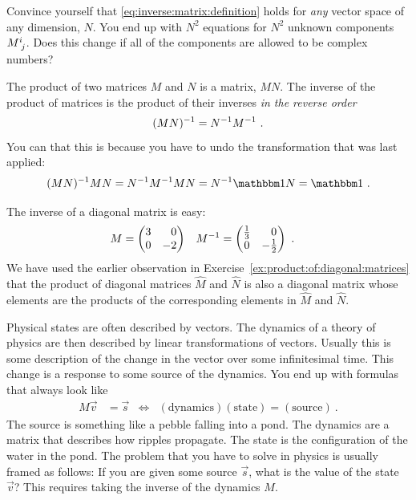 \documentclass[12pt]{article}
\begin{document}
\begin{exercise}
Convince yourself that \eqref{eq:inverse:matrix:definition} holds for \emph{any} vector space of any dimension, $N$. You end up with $N^2$ equations for $N^2$ unknown components $M\aij{i}{j}$. Does this change if all of the components are allowed to be complex numbers?
\end{exercise}


The product of two matrices $M$ and $N$ is a matrix, $MN$. The inverse of the product of matrices is the product of their inverses \emph{in the reverse order}
\begin{align}
    (MN)^{-1} = N^{-1} M^{-1} \ .
\end{align}
You can that this is because you have to undo the transformation that was last applied:
\begin{align}
    (MN)\inv MN = N\inv M\inv MN = N\inv \one  N = \one  \ .
\end{align}




\begin{example}
The inverse of a diagonal matrix is easy:
\begin{align}
    M &=
    \begin{pmatrix}
     3 & \pp  0 \\
     0 & -2
    \end{pmatrix}
    &
    M\inv &=
    \begin{pmatrix}
    \frac{1}{3} & \pp 0 \\
    0 & -\frac{1}{2}
    \end{pmatrix} \ .
\end{align}
We have used the earlier observation in Exercise~\ref{ex:product:of:diagonal:matrices} that the product of diagonal matrices $\hat M$ and $\hat N$ is also a diagonal matrix whose elements are the products of the corresponding elements in $\hat M$ and $\hat N$.
\end{example}

Physical states are often described by vectors. The dynamics of a theory of physics are then described by linear transformations of vectors. Usually this is some description of the change in the vector over some infinitesimal time. This change is a response to some source of the dynamics. You end up with formulas that always look like
\begin{align}
    M \vec{v} &= \vec{s} 
    &
    \Leftrightarrow
    &
    (\text{dynamics})(\text{state}) = (\text{source}) \ .
\end{align}
The source is something like a pebble falling into a pond. The dynamics are a matrix that describes how ripples propagate. The state is the configuration of the water in the pond.
%
The problem that you have to solve in physics is usually framed as follows: If you are given some source $\vec{s}$, what is the value of the state $\vec{v}$? This requires taking the inverse of the dynamics $M$. 
\end{document}
